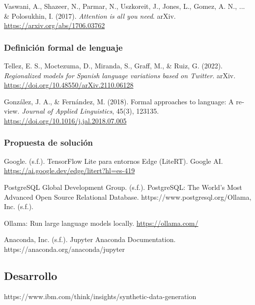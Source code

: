 \documentclass{article}
\begin{document}
Vaswani, A., Shazeer, N., Parmar, N., Uszkoreit, J., Jones, L., Gomez, A. N., ... \& Polosukhin, I. (2017). \textit{Attention is all you need}. arXiv. \url{https://arxiv.org/abs/1706.03762}

\subsubsection{Definici{\'{o}}n formal de lenguaje}

Tellez, E. S., Moctezuma, D., Miranda, S., Graff, M., \& Ruiz, G. (2022). \textit{Regionalized models for Spanish language variations based on Twitter}. arXiv. \url{https://doi.org/10.48550/arXiv.2110.06128}

\foreignlanguage{english}{Gonz{\'{a}}lez, J. A., \& Fern{\'{a}}ndez, M. (2018). Formal approaches to language: A review. }\foreignlanguage{english}{\textit{Journal of Applied Linguistics}}\foreignlanguage{english}{, 45(3), 123\textendash{}135. }\url{https://doi.org/10.1016/j.jal.2018.07.005}

\subsubsection{\foreignlanguage{spanish}{Propuesta de soluci{\'{o}}n}}

Google. (s.f.). TensorFlow Lite para entornos Edge (LiteRT). Google AI. \url{https://ai.google.dev/edge/litert?hl=es-419}

PostgreSQL Global Development Group. (s.f.). PostgreSQL: The World's Most Advanced Open Source Relational Database. https://www.postgresql.org/Ollama, Inc. (s.f.). 

Ollama: Run large language models locally. \url{https://ollama.com/}

Anaconda, Inc. (s.f.). Jupyter \textendash{} Anaconda Documentation. https://anaconda.org/anaconda/jupyter

\subsection{Desarrollo}

https://www.ibm.com/think/insights/synthetic-data-generation


\end{document}
